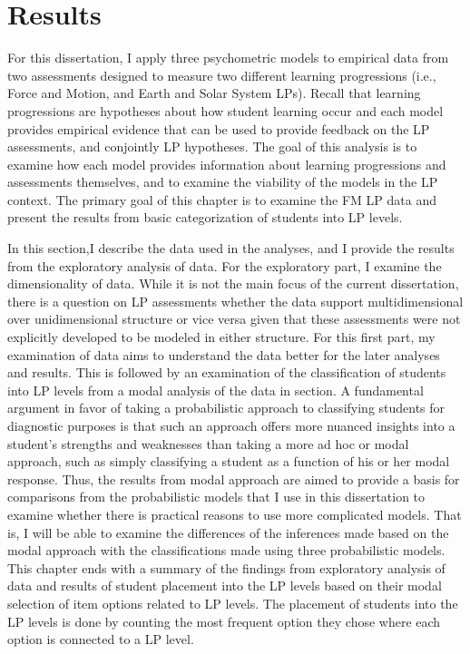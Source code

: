 \chapter{Results}
For this dissertation, I apply three psychometric models to empirical data from two assessments designed to measure two different learning progressions (i.e., Force and Motion, and Earth and Solar System LPs). Recall that learning progressions are hypotheses about how student learning occur and each model provides empirical evidence that can be used to provide feedback on the LP assessments, and conjointly LP hypotheses. The goal of this analysis is to examine how each model provides information about learning progressions and assessments themselves, and to examine the viability of the models in the LP context. The primary goal of this chapter is to examine the FM LP data and present the results from basic categorization of students into LP levels. 

In this section,I describe the data used in the analyses, and I provide the results from the exploratory analysis of data. For the exploratory part, I examine the dimensionality of data. While it is not the main focus of the current dissertation, there is a question on LP assessments whether the data support multidimensional over unidimensional structure or vice versa given that these assessments were not explicitly developed to be modeled in either structure. For this first part, my examination of data aims to understand the data better for the later analyses and results. This is followed by an examination of the classification of students into LP levels from a modal analysis of the data in section. A fundamental argument in favor of taking a probabilistic approach to classifying students for diagnostic purposes is that such an approach offers more nuanced insights into a student's strengths and weaknesses than taking a more ad hoc or modal  approach, such as simply classifying a student as a function of his or her modal response. Thus, the results from modal approach are aimed to provide a basis for comparisons from the probabilistic models that I use in this dissertation to examine whether there is practical reasons to use more complicated models. That is, I will be able to examine the differences of the inferences made based on the modal approach with the classifications made using three probabilistic models. This chapter ends with a summary of the findings from exploratory analysis of data and results of student placement into the LP levels based on their modal selection of item options related to LP levels. The placement of students into the LP levels is done by counting the most frequent option they chose where each option is connected to a LP level.  
